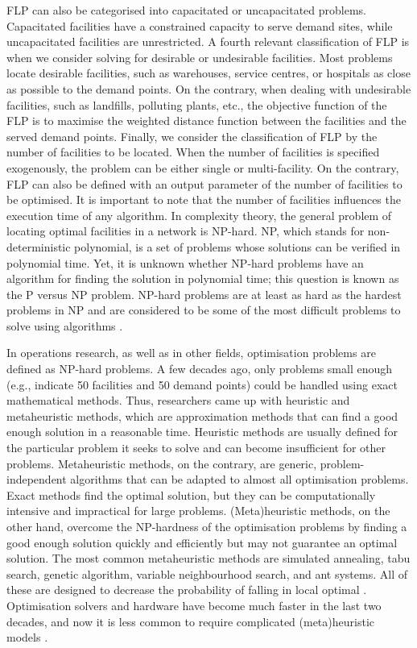 FLP can also be categorised into capacitated or uncapacitated problems. Capacitated facilities have a constrained capacity to serve demand sites, while uncapacitated facilities are unrestricted. A fourth relevant classification of FLP is when we consider solving for desirable or undesirable facilities. Most problems locate desirable facilities, such as warehouses, service centres, or hospitals as close as possible to the demand points. On the contrary, when dealing with undesirable facilities, such as landfills, polluting plants, etc., the objective function of the FLP is to maximise the weighted distance function between the facilities and the served demand points. Finally, we consider the classification of FLP by the number of facilities to be located. When the number of facilities is specified exogenously, the problem can be either single or multi-facility. On the contrary, FLP can also be defined with an output parameter of the number of facilities to be optimised. It is important to note that the number of facilities influences the execution time of any algorithm. In complexity theory, the general problem of locating optimal facilities in a network is NP-hard. NP, which stands for non-deterministic polynomial, is a set of problems whose solutions can be verified in polynomial time. Yet, it is unknown whether NP-hard problems have an algorithm for finding the solution in polynomial time; this question is known as the P versus NP problem. NP-hard problems are at least as hard as the hardest problems in NP and are considered to be some of the most difficult problems to solve using algorithms \cite{kokash2005introduction, cooper1963location}.

In operations research, as well as in other fields, optimisation problems are defined as NP-hard problems. A few decades ago, only problems small enough (e.g., \cite{sridharan1995capacitated} indicate 50 facilities and 50 demand points) could be handled using exact mathematical methods. Thus, researchers came up with heuristic and metaheuristic methods, which are approximation methods that can find a good enough solution in a reasonable time. Heuristic methods are usually defined for the particular problem it seeks to solve and can become insufficient for other problems. Metaheuristic methods, on the contrary, are generic, problem-independent algorithms that can be adapted to almost all optimisation problems. Exact methods find the optimal solution, but they can be computationally intensive and impractical for large problems. (Meta)heuristic methods, on the other hand, overcome the NP-hardness of the optimisation problems by finding a good enough solution quickly and efficiently but may not guarantee an optimal solution. The most common metaheuristic methods are simulated annealing, tabu search, genetic algorithm, variable neighbourhood search, and ant systems. All of these are designed to decrease the probability of falling in local optimal \citep{abdel2018metaheuristic}. Optimisation solvers and hardware have become much faster in the last two decades, and now it is less common to require complicated (meta)heuristic models \cite{gurobiFast}.

